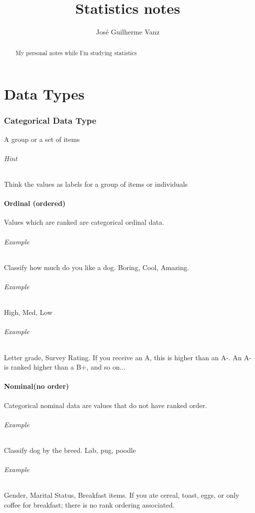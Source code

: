 \documentclass[]{article}
\title{Statistics notes}
\author{José Guilherme Vanz}
\begin{document}
\maketitle

\begin{abstract}
My personal notes while I'm studying statistics
\end{abstract}

\part{Data Types}

\section{Categorical Data Type}
A group or a set of items
\paragraph{Hint} Think the values as labels for a group of items or individuals
\subsection{Ordinal (ordered)}
Values which are ranked are categorical ordinal data. 
\paragraph{Example} Classify how much do you like a dog. Boring, Cool, Amazing. 
\paragraph{Example} High, Med, Low
\paragraph{Example} Letter grade, Survey Rating. If you receive an A, this is higher than an A-. An A- is ranked higher than a B+, and so on...

\subsection{Nominal(no order)}
Categorical nominal data are values that do not have ranked order.
\paragraph{Example} Classify dog by the breed. Lab, pug, poodle
\paragraph{Example} Gender, Marital Status, Breakfast items. If you ate cereal, toast, eggs, or only coffee for breakfast; there is no rank ordering associated.
\end{document}
